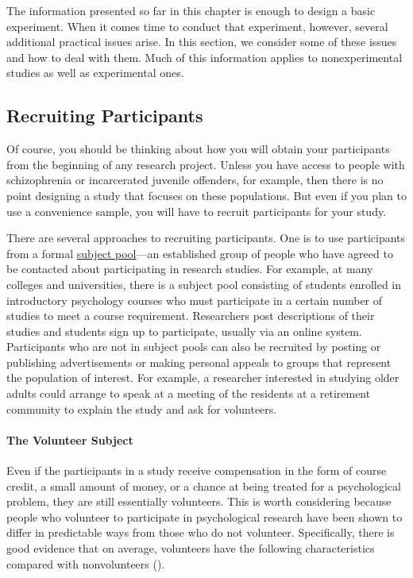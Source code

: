 \documentclass[
]{krantz}
\begin{document}
The information presented so far in this chapter is enough to design a basic experiment. When it comes time to conduct that experiment, however, several additional practical issues arise. In this section, we consider some of these issues and how to deal with them. Much of this information applies to nonexperimental studies as well as experimental ones.

\subsection*{Recruiting Participants}\label{recruiting-participants}


Of course, you should be thinking about how you will obtain your participants from the beginning of any research project. Unless you have access to people with schizophrenia or incarcerated juvenile offenders, for example, then there is no point designing a study that focuses on these populations. But even if you plan to use a convenience sample, you will have to recruit participants for your study.

There are several approaches to recruiting participants. One is to use participants from a formal \hyperref[subject-pool]{subject pool}---an established group of people who have agreed to be contacted about participating in research studies. For example, at many colleges and universities, there is a subject pool consisting of students enrolled in introductory psychology courses who must participate in a certain number of studies to meet a course requirement. Researchers post descriptions of their studies and students sign up to participate, usually via an online system. Participants who are not in subject pools can also be recruited by posting or publishing advertisements or making personal appeals to groups that represent the population of interest. For example, a researcher interested in studying older adults could arrange to speak at a meeting of the residents at a retirement community to explain the study and ask for volunteers.

\paragraph*{The Volunteer Subject}\label{the-volunteer-subject}

Even if the participants in a study receive compensation in the form of course credit, a small amount of money, or a chance at being treated for a psychological problem, they are still essentially volunteers. This is worth considering because people who volunteer to participate in psychological research have been shown to differ in predictable ways from those who do not volunteer. Specifically, there is good evidence that on average, volunteers have the following characteristics compared with nonvolunteers ().
\end{document}

